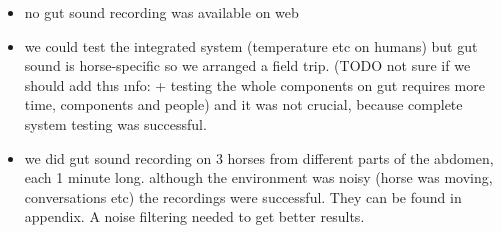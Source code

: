 \begin{itemize}
\item no gut sound recording was available on web
\item we could test the integrated system (temperature etc on humans) but gut sound is horse-specific so we arranged a field trip. (TODO{} not sure if we should add thıs ınfo: + testing the whole components on gut requires more time, components and people) and it was not crucial, because complete system testing was successful.
\item we did gut sound recording on 3 horses from different parts of the abdomen, each 1 minute long. although the environment was noisy (horse was moving, conversations etc) the recordings were successful. They can be found in appendix. A noise filtering needed to get better results.
\end{itemize}


